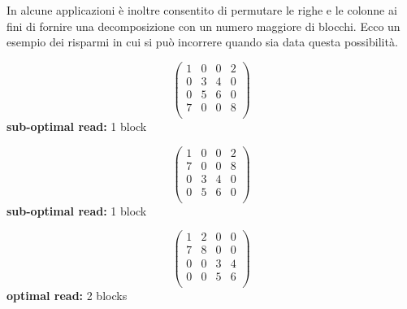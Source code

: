 In alcune applicazioni è inoltre consentito di permutare le righe e le colonne ai fini di fornire una decomposizione con un numero maggiore di blocchi. Ecco un esempio dei risparmi in cui si può incorrere quando sia data questa possibilità.

\begin{table}[!h]
  \begin{minipage}{.33\textwidth}
    \centering
\[
\left(
\begin{array}{cccc}
    1 & 0 & 0 & 2  \\
    0 & 3 & 4 & 0  \\
    0 & 5 & 6 & 0  \\
    7 & 0 & 0 & 8  \\
\end{array}\right)
\]
    {\bf sub-optimal read:} 1 block
  \end{minipage}%
  \begin{minipage}{.33\textwidth}
    \centering
\[
\left(
\begin{array}{cccc}
    1 & 0 & 0 & 2  \\
    7 & 0 & 0 & 8  \\
    0 & 3 & 4 & 0  \\
    0 & 5 & 6 & 0  \\
\end{array}\right)
\]
    {\bf sub-optimal read:} 1 block
  \end{minipage}%
  \begin{minipage}{.5\textwidth}
    \centering
\[
\left(
\begin{array}{c|cc|c}
    1  & 2 & 0  & 0  \\   \hline
    7  & 8 & 0  & 0  \\
    0  & 0 & 3  & 4  \\   \hline
    0  & 0 & 5  & 6  \\
\end{array}\right)
\]
    {\bf optimal read:} 2 blocks
    \end{minipage}
\end{table}


